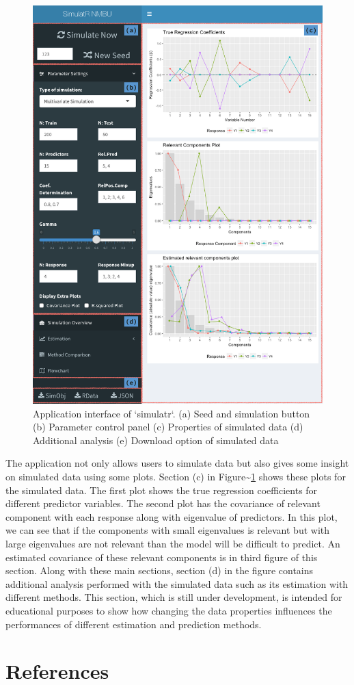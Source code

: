 \documentclass[12pt,A4paper,authoryear]{elsarticle} %
\theoremstyle{definition}
\theoremstyle{definition}
\theoremstyle{remark}
\begin{document}
\begin{figure}[!hbt]

{\centering \includegraphics[width=0.95\linewidth]{images/screenshots/AppSimulatr} 

}

\caption{Application interface of `simulatr`. (a) Seed and simulation button (b) Parameter control panel (c) Properties of simulated data (d) Additional analysis (e) Download option of simulated data}\label{fig:AppSimulatr}
\end{figure}

The application not only allows users to simulate data but also gives
some insight on simulated data using some plots. Section (c) in
Figure\textasciitilde{}\ref{fig:AppSimulatr} shows these plots for the
simulated data. The first plot shows the true regression coefficients
for different predictor variables. The second plot has the covariance of
relevant component with each response along with eigenvalue of
predictors. In this plot, we can see that if the components with small
eigenvalues is relevant but with large eigenvalues are not relevant than
the model will be difficult to predict. An estimated covariance of these
relevant components is in third figure of this section. Along with these
main sections, section (d) in the figure contains additional analysis
performed with the simulated data such as its estimation with different
methods. This section, which is still under development, is intended for
educational purposes to show how changing the data properties influences
the performances of different estimation and prediction methods.

\section*{References}\label{references}


\renewcommand\refname{References}

\end{document}
